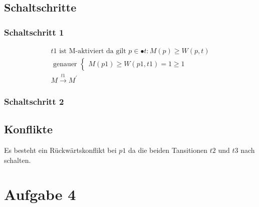 \documentclass[10pt]{scrartcl}
\begin{document}
	\subsection{Schaltschritte}
	
	\subsubsection{Schaltschritt 1}
		\begin{align}
			t1 \text{ ist M-aktiviert da gilt } p \in \bullet t:M(p) \geq W(p,t)\\
			\text{ genauer }\begin{cases}
				M(p1) \geq W(p1,t1) = 1 \geq 1	
			\end{cases}\\
			
			M\overset{t1}{\rightarrow}M^{'}		
		\end{align}
	\subsubsection{Schaltschritt 2}
	
	\subsection{Konflikte}
	Es besteht ein Rückwärtskonflikt bei $p1$ da die beiden Tansitionen $t2$ und $t3$ nach schalten.
	
\section{Aufgabe 4}
\end{document}
